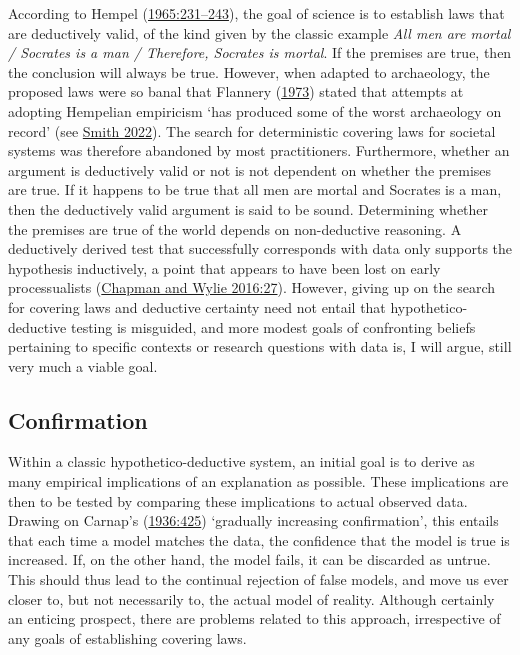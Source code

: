 \documentclass[
  12pt,
  a4paper,
  oneside]{book}
\begin{document}
According to Hempel (\protect\hyperlink{ref-hempel1965}{1965:231--243}), the goal of science is to establish laws that are deductively valid, of the kind given by the classic example \emph{All men are mortal / Socrates is a man / Therefore, Socrates is mortal}. If the premises are true, then the conclusion will always be true. However, when adapted to archaeology, the proposed laws were so banal that Flannery (\protect\hyperlink{ref-flannery1973}{1973}) stated that attempts at adopting Hempelian empiricism `has produced some of the worst archaeology on record' (see \protect\hyperlink{ref-smith2022}{Smith 2022}). The search for deterministic covering laws for societal systems was therefore abandoned by most practitioners. Furthermore, whether an argument is deductively valid or not is not dependent on whether the premises are true. If it happens to be true that all men are mortal and Socrates is a man, then the deductively valid argument is said to be sound. Determining whether the premises are true of the world depends on non-deductive reasoning. A deductively derived test that successfully corresponds with data only supports the hypothesis inductively, a point that appears to have been lost on early processualists (\protect\hyperlink{ref-chapman2016}{Chapman and Wylie 2016:27}). However, giving up on the search for covering laws and deductive certainty need not entail that hypothetico-deductive testing is misguided, and more modest goals of confronting beliefs pertaining to specific contexts or research questions with data is, I will argue, still very much a viable goal.

\hypertarget{confirmation}{%
\subsection{Confirmation}\label{confirmation}}

Within a classic hypothetico-deductive system, an initial goal is to derive as many empirical implications of an explanation as possible. These implications are then to be tested by comparing these implications to actual observed data. Drawing on Carnap's (\protect\hyperlink{ref-carnap1936}{1936:425}) `gradually increasing confirmation', this entails that each time a model matches the data, the confidence that the model is true is increased. If, on the other hand, the model fails, it can be discarded as untrue. This should thus lead to the continual rejection of false models, and move us ever closer to, but not necessarily to, the actual model of reality. Although certainly an enticing prospect, there are problems related to this approach, irrespective of any goals of establishing covering laws.
\end{document}
